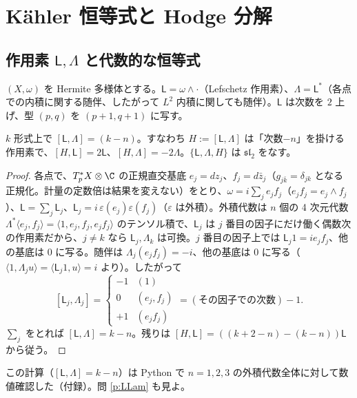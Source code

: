 
\section{Kähler 恒等式と Hodge 分解}\label{sec:kid}

\subsection{作用素 $\mathsf L,\Lambda$ と代数的な恒等式}
$(X,\omega)$ を Hermite 多様体とする。$\mathsf L=\omega\wedge\cdot$（Lefschetz 作用素）、$\Lambda=\mathsf L^*$（各点での内積に関する随伴、したがって $L^2$ 内積に関しても随伴）。$\mathsf L$ は次数を $2$ 上げ、型 $(p,q)$ を $(p+1,q+1)$ に写す。

\begin{prop}\label{prop:sl2}\tP
$k$ 形式上で $[\mathsf L,\Lambda]=(k-n)$。すなわち $H:=[\mathsf L,\Lambda]$ は「次数$-n$」を掛ける作用素で、$[H,\mathsf L]=2\mathsf L$、$[H,\Lambda]=-2\Lambda$。$\{\mathsf L,\Lambda,H\}$ は $\mathfrak{sl}_2$ をなす。
\end{prop}
\begin{proof}
各点で、$T^*_pX\otimes\C$ の正規直交基底 $e_j=dz_j$、$f_j=d\bar z_j$（$g_{j\bar k}=\delta_{jk}$ となる正規化。計量の定数倍は結果を変えない）をとり、$\omega=i\sum_je_jf_j$（$e_jf_j=e_j\wedge f_j$）、$\mathsf L=\sum_j\mathsf L_j$、$\mathsf L_j=i\,\varepsilon(e_j)\varepsilon(f_j)$（$\varepsilon$ は外積）。外積代数は $n$ 個の 4 次元代数 $\Lambda^*\langle e_j,f_j\rangle=\langle1,e_j,f_j,e_jf_j\rangle$ のテンソル積で、$\mathsf L_j$ は $j$ 番目の因子にだけ働く偶数次の作用素だから、$j\ne k$ なら $\mathsf L_j,\Lambda_k$ は可換。$j$ 番目の因子上では $\mathsf L_j1=ie_jf_j$、他の基底は $0$ に写る。随伴は $\Lambda_j(e_jf_j)=-i$、他の基底は $0$ に写る（$\langle1,\Lambda_ju\rangle=\langle\mathsf L_j1,u\rangle=i$ より）。したがって
\[
[\mathsf L_j,\Lambda_j]=\begin{cases}-1&(1)\\0&(e_j,f_j)\\+1&(e_jf_j)\end{cases}=(\text{その因子での次数})-1 .
\]
$\sum_j$ をとれば $[\mathsf L,\Lambda]=k-n$。残りは $[H,\mathsf L]=((k+2-n)-(k-n))\mathsf L$ から従う。
\end{proof}
この計算（$[\mathsf L,\Lambda]=k-n$）は Python で $n=1,2,3$ の外積代数全体に対して数値確認した（付録）。問 \ref{p:LLam} も見よ。

